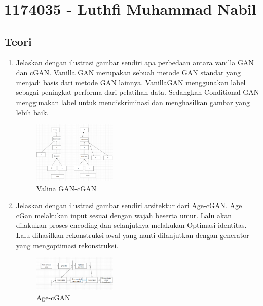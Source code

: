\section{1174035 - Luthfi Muhammad Nabil}

\subsection{Teori}
    \begin{enumerate}

        \item Jelaskan dengan ilustrasi gambar sendiri apa perbedaan antara vanilla GAN dan cGAN.
		Vanilla GAN merupakan sebuah metode GAN standar yang menjadi basis dari metode GAN lainnya. VanillaGAN menggunakan label sebagai peningkat performa dari pelatihan data. Sedangkan Conditional GAN menggunakan label untuk mendiskriminasi dan menghasilkan gambar yang lebih baik.
			\begin{figure}[H]
            	\includegraphics[width=4cm]{figures/1174035/chapter9/teori1.png}
           		\centering
           		\caption{Valina GAN-cGAN}
            \end{figure}
            
        \item Jelaskan dengan ilustrasi gambar sendiri arsitektur dari Age-cGAN.
			Age cGan melakukan input sesuai dengan wajah beserta umur. Lalu akan dilakukan proses encoding dan selanjutnya melakukan Optimasi identitas. Lalu dihasilkan rekonstruksi awal yang nanti dilanjutkan dengan generator yang mengoptimasi rekonstruksi.
			\begin{figure}[H]
				\includegraphics[width=4cm]{figures/1174035/chapter9/teori2.png}
            		\centering
           		\caption{Age-cGAN}
            \end{figure}
                

\end{enumerate}
